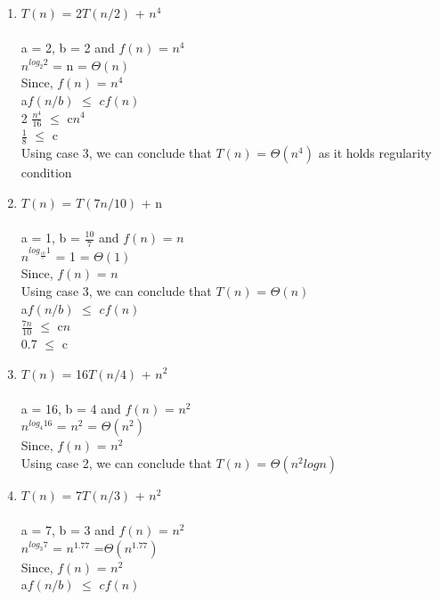 \documentclass{article}
\begin{document}
\begin{enumerate}
    \begin{enumerate}
        \item $T(n)$ = 2$T(n/2)$ + $n^4$\\\\
        a = 2, b = 2 and $f(n)$ = $n^4$\\
        $n^{log_2^{}2}$ = n = $\Theta(n)$\\
        Since, $f(n)$ = $n^4$\\
        a$f(n/b)$ $\leq$ $cf(n)$\\
        2 $\frac{n^4}{16}$ $\leq$ c$n^4$\\
        $\frac{1}{8}$ $\leq$ c\\
        Using case 3, we can conclude that $T(n)$ = $\Theta(n^4)$  as it holds regularity condition\\
        \item $T(n)$ = $T(7n/10)$ + n \\\\
        a = 1, b = $\frac{10}{7}$ and $f(n)$ = $n$\\
        $n^{log_\frac{10}{7}^{}1}$ = 1 = $\Theta(1)$ \\
        Since, $f(n)$ = $n$\\
        Using case 3, we can conclude that $T(n)$ = $\Theta(n)$\\
        a$f(n/b)$ $\leq$ $cf(n)$\\
        $\frac{7n}{10}$ $\leq$ c$n$\\
        0.7 $\leq$ c\\
        \item $T(n)$ = 16$T(n/4)$ + $n^2$ \\\\
        a = 16, b = 4 and $f(n)$ = $n^2$\\
        $n^{log_4^{}16}$ = $n^2$ = $\Theta(n^2)$ \\
        Since, $f(n)$ = $n^2$\\
        Using case 2, we can conclude that $T(n)$ = $\Theta(n^2logn)$\\
        \item $T(n)$ = 7$T(n/3)$ + $n^2$\\\\
        a = 7, b = 3 and $f(n)$ = $n^2$\\
        $n^{log_3^{}7}$ = $n^{1.77}$ =$\Theta(n^{1.77})$\\
        Since, $f(n)$ = $n^2$\\
        a$f(n/b)$ $\leq$ $cf(n)$\\

\end{enumerate}
\end{enumerate}
\end{document}
